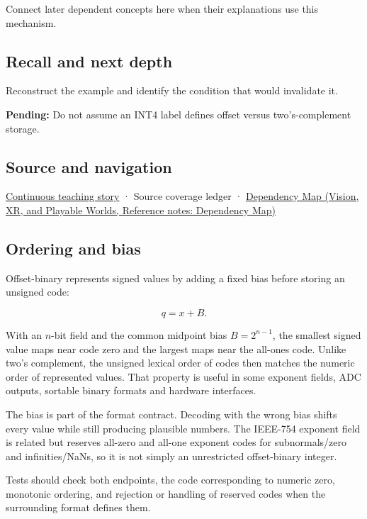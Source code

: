 Connect later dependent concepts here when their explanations use this mechanism.

\subsection{Recall and next depth}\label{appendix-53a8cfb25f8d-recall-and-next-depth}

\hypertarget{appendix-53a8cfb25f8d-recall-and-next-depth}{}

Reconstruct the example and identify the condition that would invalidate it.

\textbf{Pending:} Do not assume an INT4 label defines offset versus two's-complement storage.

\subsection{Source and navigation}\label{appendix-53a8cfb25f8d-source-and-navigation}

\hypertarget{appendix-53a8cfb25f8d-source-and-navigation}{}

\hyperref[01-foundations-i-ch001-choosing-what-information-to-keep]{Continuous teaching story} · {Source coverage ledger} · \href{../07-Vision-XR-and-Playable-Worlds/main.pdf\#nameddest=appendix-4ad47bdd269a}{Dependency Map (Vision, XR, and Playable Worlds, Reference notes: Dependency Map)}

\subsection{Ordering and bias}\label{appendix-53a8cfb25f8d-ordering-and-bias}

\hypertarget{appendix-53a8cfb25f8d-ordering-and-bias}{}

Offset-binary represents signed values by adding a fixed bias before storing an unsigned code:

\[q=x+B.\]

With an \(n\)-bit field and the common midpoint bias \(B=2^{n-1}\), the smallest signed value maps near code zero and the largest maps near the all-ones code. Unlike two's complement, the unsigned lexical order of codes then matches the numeric order of represented values. That property is useful in some exponent fields, ADC outputs, sortable binary formats and hardware interfaces.

The bias is part of the format contract. Decoding with the wrong bias shifts every value while still producing plausible numbers. The IEEE-754 exponent field is related but reserves all-zero and all-one exponent codes for subnormals/zero and infinities/NaNs, so it is not simply an unrestricted offset-binary integer.

Tests should check both endpoints, the code corresponding to numeric zero, monotonic ordering, and rejection or handling of reserved codes when the surrounding format defines them.
